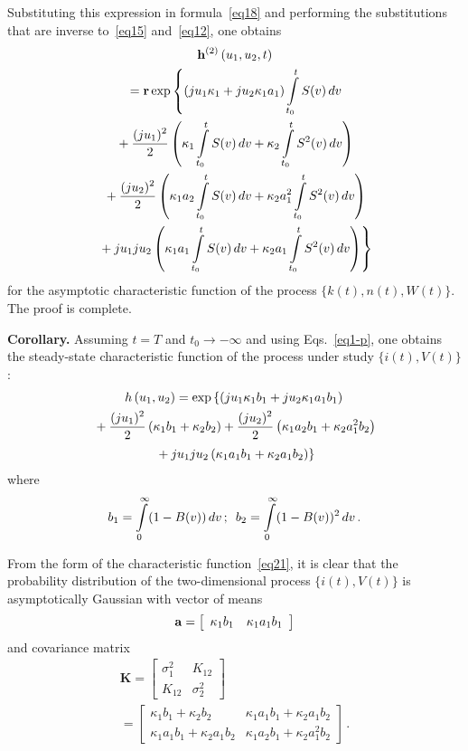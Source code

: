 \begin{multicols}{2}
Substituting this expression in formula~\eqref{eq18} and performing 
the substitutions that are inverse to~\eqref{eq15} and~\eqref{eq12}, one obtains
\begin{multline*}
{\bf{h}}^{(2)}\left(u_1,u_2,t\right)\\
{}=
{\bf{r}} \exp\left\{ \left(ju_1\kappa_1+ju_2\kappa_1a_1\right)
\int\limits_{t_0}^tS(v)\,dv\right. 
\\
{}+\displaystyle\frac{\displaystyle (ju_1)^2\mathstrut}{\displaystyle 2\mathstrut}\left(\kappa_1\int\limits_{t_0}^tS(v)\,dv+
\kappa_2\int\limits_{t_0}^tS^2(v)\,dv\right)\\
{}+\displaystyle\frac{\displaystyle (ju_2)^2\mathstrut}{\displaystyle 2\mathstrut}\left(\kappa_1a_2\int\limits_{t_0}^tS(v)\,dv+
\kappa_2a_1^2\int\limits_{t_0}^tS^2(v)\,dv\right)
\\
\left.
{}+ju_1ju_2\left(\kappa_1a_1\int\limits_{t_0}^tS(v)\,dv+
\kappa_2a_1\int\limits_{t_0}^tS^2(v)\,dv\right)\right\} 
\end{multline*}
for the asymptotic characteristic function of the process
 $\{k(t),n(t),W(t)\}$. The proof is complete.
 
\columnbreak
 
 \noindent
 \textbf{Corollary.}
Assuming $t = T$ and $t_0\to -\infty $ and using Eqs.~\eqref{eq1-p}, one obtains 
the steady-state characteristic function of the process under study $\{i(t),V(t)\}$:
\begin{multline}
h\left(u_1,u_2\right)= 
\exp\left\{ \left(ju_1\kappa_1b_1+ju_2\kappa_1a_1b_1\right)\right.\\
{}+
\displaystyle\frac{\displaystyle (ju_1)^2\mathstrut}{\displaystyle 2\mathstrut}\left(\kappa_1b_1
+\kappa_2b_2\right)
+\displaystyle\frac{\displaystyle (ju_2)^2\mathstrut}{\displaystyle 2\mathstrut}\left(\kappa_1a_2b_1+\kappa_2a_1^2b_2\right)\\
\left.{}+
ju_1ju_2\left(\kappa_1a_1b_1+\kappa_2a_1b_2\right)\right\}
\label{eq21}
\end{multline}
where 
$$
b_1=\int\limits_0^{\infty}(1-B(v))\,dv\,;\enskip  
b_2=\int\limits_0^{\infty}(1-B(v))^2\,dv\,.
$$


From the form of the characteristic function~\eqref{eq21}, it is clear 
that the probability distribution of the two-dimensional process $\{i(t),V(t)\}$ 
is asymptotically Gaussian with vector of means
$$
{\bf a}=\left[
\begin{array}{lr}
\kappa_1b_1 &  \kappa_1a_1b_1
\end{array}
\right]
$$
and covariance matrix
\begin{multline*}
\mathbf{K}=\left[
\begin{array}{cc}
\sigma_1^2 &  K_{12} \\
K_{12} & \sigma_2^2
\end{array}
\right]\\
{}=
\left[
\begin{array}{cc}
\kappa_1b_1+\kappa_2b_2 &  \kappa_1a_1b_1+\kappa_2a_1b_2 \\
\kappa_1a_1b_1+\kappa_2a_1b_2 & \kappa_1a_2b_1+\kappa_2a_1^2b_2
\end{array}
\right]\,.
\end{multline*}


\end{multicols}
